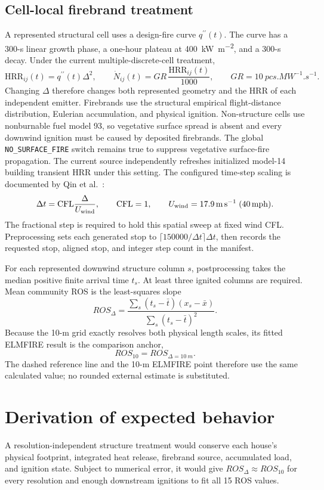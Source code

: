 \subsection{Cell-local firebrand treatment}

A represented structural cell uses a design-fire curve \(q^{\prime\prime}(t)\). The curve has a 300-s linear growth phase, a one-hour plateau at \SI{400}{kW.m^{-2}}, and a 300-s decay. Under the current
multiple-discrete-cell treatment,
\[
 \mathrm{HRR}_{ij}(t)=q^{\prime\prime}(t)\Delta^2,
 \qquad \dot N_{ij}(t)=GR\,\frac{\mathrm{HRR}_{ij}(t)}{1000},
 \qquad GR=\SI{10}{pcs.MW^{-1}.s^{-1}}.
\]
Changing \(\Delta\) therefore changes both represented geometry and the HRR
of each independent emitter. Firebrands use the structural empirical
flight-distance distribution, Eulerian accumulation, and physical ignition.
Non-structure cells use nonburnable fuel model 93, so vegetative surface
spread is absent and every downwind ignition must be caused by deposited
firebrands.  The global \texttt{NO\_SURFACE\_FIRE} switch remains true to suppress vegetative surface-fire propagation.  The current source independently refreshes initialized model-14 building transient HRR under this setting. The configured time-step scaling is
documented by Qin et al.~\cite{QinEtAl2026}:
\[
 \Delta t=\mathrm{CFL}\frac{\Delta}{U_{\rm wind}},
 \qquad \mathrm{CFL}=1,
 \qquad U_{\rm wind}=\SI{17.9}{m.s^{-1}}\;(\SI{40}{mph}).
\]
The fractional step is required to hold this spatial sweep at fixed wind CFL.
Preprocessing sets each generated stop to
\(\lceil150000/\Delta t\rceil\Delta t\), then records the requested stop,
aligned stop, and integer step count in the manifest.

For each represented downwind structure column \(s\), postprocessing takes the
median positive finite arrival time \(t_s\). At least three ignited columns are
required. Mean community ROS is the least-squares slope
\[
 ROS_\Delta =
 \frac{\sum_s(t_s-\bar t)(x_s-\bar x)}
      {\sum_s(t_s-\bar t)^2}.
\]
Because the 10-m grid exactly resolves both physical length scales, its fitted
ELMFIRE result is the comparison anchor,
\[
 ROS_{10}=ROS_{\Delta=\SI{10}{m}}.
\]
The dashed reference line and the 10-m ELMFIRE point therefore use the same
calculated value; no rounded external estimate is substituted.

\section{Derivation of expected behavior}
A resolution-independent structure treatment would conserve each house's
physical footprint, integrated heat release, firebrand source, accumulated
load, and ignition state. Subject to numerical error, it would give
\(ROS_\Delta\approx ROS_{10}\) for every resolution and enough downstream
ignitions to fit all 15 ROS values.

